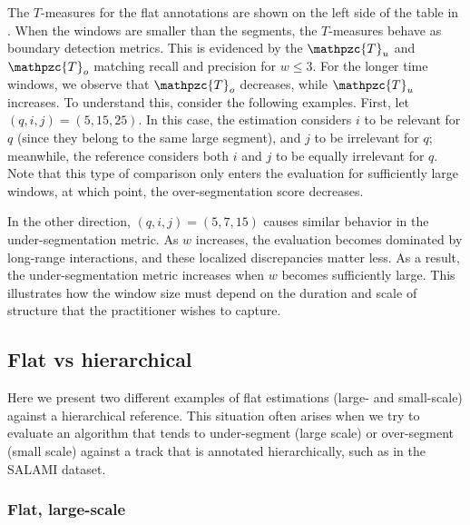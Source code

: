 \documentclass{article}
\def\shag{\ensuremath{\mathpzc{T}}}
\begin{document}
The $T$-measures for the flat annotations are shown on the left side of the table in .
When the windows are smaller than the segments, the $T$-measures behave as boundary detection metrics.
This is evidenced by the $\shag_u$ and $\shag_o$ matching recall and precision for $w \leq 3$.
For the longer time windows, we observe that $\shag_o$ decreases, while $\shag_u$ increases.
To understand this, consider the following examples.
First, let $(q,i,j) = (5,15,25)$.
In this case, the estimation considers $i$ to be relevant for $q$ (since they belong to the same large segment), and $j$ to be irrelevant for $q$; meanwhile, the reference considers both $i$ and $j$ to be equally irrelevant for $q$.
Note that this type of comparison only enters the evaluation for sufficiently large windows, at which point, the over-segmentation score decreases.  

In the other direction, $(q,i,j) = (5, 7, 15)$ causes similar behavior in the under-segmentation metric.
As $w$ increases, the evaluation becomes dominated by long-range interactions, and these localized discrepancies matter less.
As a result, the under-segmentation metric increases when $w$ becomes sufficiently large.
This illustrates how the window size must depend on the duration and scale of structure that the practitioner wishes to capture. 

\subsection{Flat vs hierarchical}

Here we present two different examples of flat estimations (large- and small-scale) against a hierarchical reference.
This situation often arises when we try to evaluate an algorithm that tends to under-segment (large scale) or over-segment (small scale) against a track that is annotated
hierarchically, such as in the SALAMI dataset.

\subsubsection{Flat, large-scale}
\end{document}
